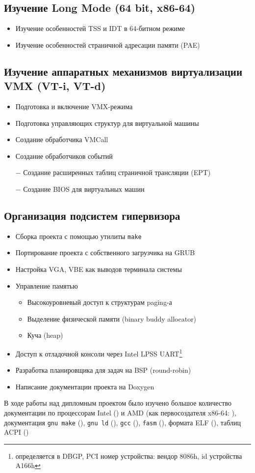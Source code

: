 \documentclass[a4paper,11pt]{extarticle}
\begin{document}
	\subsection{Изучение Long Mode (64 bit, x86-64)}
	\begin{itemize}
		\item Изучение особенностей TSS и IDT в 64-битном режиме
		\item Изучение особенностей страничной адресации памяти (PAE)
	\end{itemize}
	\subsection{Изучение аппаратных механизмов виртуализации VMX (VT-i, VT-d)}
	\begin{itemize}
		\item Подготовка и включение VMX-режима
		\item Подготовка управляющих структур для виртуальной машины
		\item Создание обработчика VMCall
		\item Создание обработчиков событий
		\item[$-$] Создание расширенных таблиц страничной трансляции (EPT)
		\item[$-$] Создание BIOS для виртуальных машин
	\end{itemize}
	\subsection{Организация подсистем гипервизора}
	\begin{itemize}
		\item Сборка проекта с помощью утилиты \texttt{make}
		\item Портирование проекта с собственного загрузчика на GRUB
		\item Настройка VGA, VBE как выводов терминала системы
		\item Управление памятью
		\renewcommand{\labelitemii}{$\blacksquare$}
		\begin{itemize}
			\item Высокоуровневый доступ к структурам paging-а
			\item Выделение физической памяти (binary buddy allocator)
			\item Куча (heap)
		\end{itemize}
		\item Доступ к отладочной консоли через Intel LPSS UART\footnote{определяется в DBGP, PCI номер устройства: вендор 8086h, id устройства A166h}
		\item Разработка планировщика для задач на BSP (round-robin)
		\item Написание документации проекта на Doxygen
	\end{itemize}\pagebreak
	\par
	В ходе работы над дипломным проектом было изучено большое количество документации по процессорам Intel (\cite{intel}) и AMD (как первосоздателя x86-64: \cite{amd}), документация \texttt{gnu make} (\cite{make}), \texttt{gnu ld} (\cite{ld}), \texttt{gcc} (\cite{gcc}), \texttt{fasm} (\cite{fasm}), формата ELF (\cite{elf}), таблиц ACPI (\cite{acpi})
\end{document}
